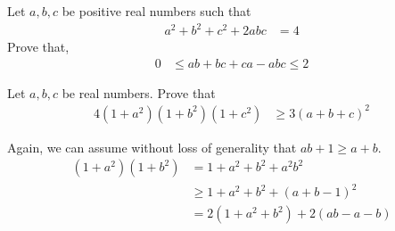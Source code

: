 \documentclass[inequalities.tex]{subfile}
\begin{document}
		\begin{problem}
			Let $a,b,c$ be positive real numbers such that
				\begin{align*}
					a^{2}+b^{2}+c^{2}+2abc
						& = 4
				\end{align*}
			Prove that,
				\begin{align*}
					0
						& \leq ab+bc+ca-abc\leq 2
				\end{align*}

				\begin{solution}

				\end{solution}
		\end{problem}

		\begin{problem}
			Let $a,b,c$ be real numbers. Prove that
				\begin{align*}
					4(1+a^{2})(1+b^{2})(1+c^{2})
						& \geq 3(a+b+c)^{2}
				\end{align*}

				\begin{solution}
					Again, we can assume without loss of generality that $ab+1\geq a+b$.
						\begin{align*}
							(1+a^{2})(1+b^{2})
								& = 1+a^{2}+b^{2}+a^{2}b^{2}\\
								& \geq 1+a^{2}+b^{2}+(a+b-1)^{2}\\
								& = 2(1+a^{2}+b^{2})+2(ab-a-b)
						\end{align*}
				\end{solution}
		\end{problem}
\end{document}
